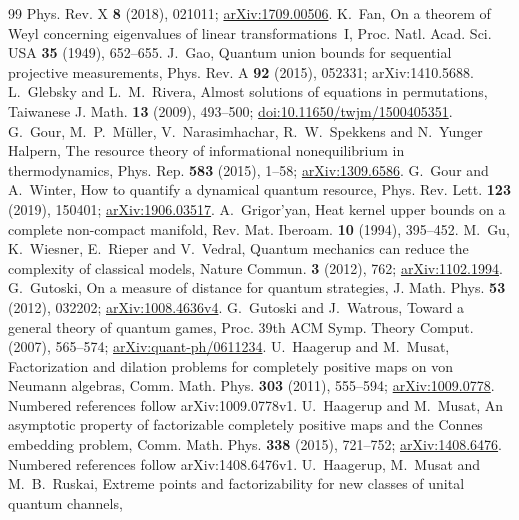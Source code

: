 \begin{thebibliography}{99}
Phys. Rev. X \textbf{8} (2018), 021011;
\href{https://arxiv.org/abs/1709.00506}{arXiv:1709.00506}.
 K.~Fan, On a theorem of Weyl concerning eigenvalues of linear transformations~I, Proc. Natl. Acad. Sci. USA \textbf{35} (1949), 652--655.
 J.~Gao, Quantum union bounds for sequential projective measurements, Phys. Rev. A \textbf{92} (2015), 052331; arXiv:1410.5688.
 L.~Glebsky and L.~M.~Rivera, Almost solutions of equations in permutations,
Taiwanese J. Math. \textbf{13} (2009), 493--500;
\href{https://doi.org/10.11650/twjm/1500405351}{doi:10.11650/twjm/1500405351}.
 G.~Gour, M.~P.~M\"uller, V.~Narasimhachar, R.~W.~Spekkens and N.~Yunger Halpern,
The resource theory of informational nonequilibrium in thermodynamics, Phys. Rep. \textbf{583} (2015), 1--58;
\href{https://arxiv.org/abs/1309.6586}{arXiv:1309.6586}.
 G.~Gour and A.~Winter, How to quantify a dynamical quantum resource,
Phys. Rev. Lett. \textbf{123} (2019), 150401;
\href{https://arxiv.org/abs/1906.03517}{arXiv:1906.03517}.
 A.~Grigor'yan, Heat kernel upper bounds on a complete non-compact manifold, Rev. Mat. Iberoam. \textbf{10} (1994), 395--452.
 M.~Gu, K.~Wiesner, E.~Rieper and V.~Vedral,
Quantum mechanics can reduce the complexity of classical models,
Nature Commun. \textbf{3} (2012), 762;
\href{https://arxiv.org/abs/1102.1994}{arXiv:1102.1994}.
 G.~Gutoski, On a measure of distance for quantum strategies,
J. Math. Phys. \textbf{53} (2012), 032202;
\href{https://arxiv.org/abs/1008.4636v4}{arXiv:1008.4636v4}.
 G.~Gutoski and J.~Watrous,
Toward a general theory of quantum games, Proc. 39th ACM Symp. Theory Comput. (2007), 565--574;
\href{https://arxiv.org/abs/quant-ph/0611234}{arXiv:quant-ph/0611234}.
 U.~Haagerup and M.~Musat, Factorization and dilation problems for completely positive maps on von Neumann algebras, Comm. Math. Phys.
\textbf{303} (2011), 555--594; \href{https://arxiv.org/abs/1009.0778}{arXiv:1009.0778}. Numbered references follow arXiv:1009.0778v1.
 U.~Haagerup and M.~Musat, An asymptotic property of factorizable completely positive maps and the Connes embedding problem, Comm. Math.
Phys. \textbf{338} (2015), 721--752; \href{https://arxiv.org/abs/1408.6476}{arXiv:1408.6476}. Numbered references follow arXiv:1408.6476v1.
 U.~Haagerup, M.~Musat and M.~B.~Ruskai,
Extreme points and factorizability for new classes of unital quantum channels,

\end{thebibliography}
